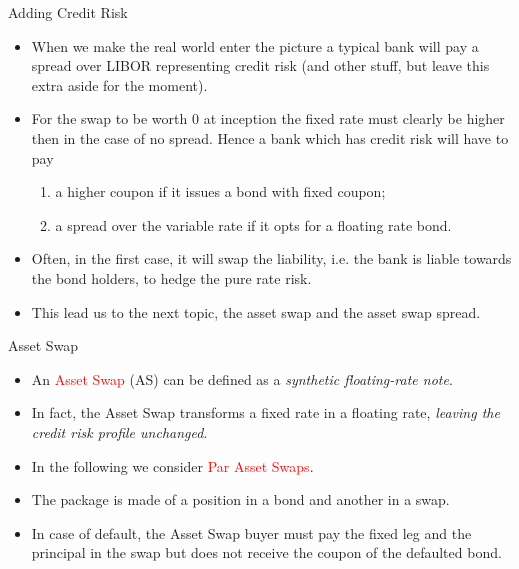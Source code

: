 \documentclass{beamer}
\begin{document}
\begin{frame}{Adding Credit Risk}
	\begin{itemize}
		\item When we make the real world enter the picture a typical bank will pay a spread over LIBOR representing credit risk (and other stuff, but leave this extra aside for the moment). 
		\item For the swap to be worth 0 at inception the fixed rate must clearly be higher then in the case of no spread. Hence a bank which has credit risk will have to pay
		\begin{enumerate}
			\item a higher coupon if it issues a bond with fixed coupon;
			\item a spread over the variable rate if it opts for a floating rate bond.
		\end{enumerate}
		\item Often, in the first case, it will swap the liability, i.e. the bank is liable towards the bond holders, to hedge the pure rate risk. 
		\item This lead us to the next topic, the asset swap and the asset swap spread.
	\end{itemize}
\end{frame}

\begin{frame}{Asset Swap}
	\begin{itemize}
		\item An \textcolor{red}{Asset Swap} (AS) can be defined as a \emph{synthetic floating-rate note}.
		\item In fact, the Asset Swap transforms a fixed rate in a floating rate, \emph{leaving the credit risk profile unchanged}.
		\item In the following we consider \textcolor{red}{Par Asset Swaps}. 
		\item The package is made of a position in a bond and another in a swap.
		\item In case of default, the Asset Swap buyer must pay the fixed leg and the principal in the swap but does not receive the coupon of the defaulted bond. 
	\end{itemize}
\end{frame}
\end{document}
